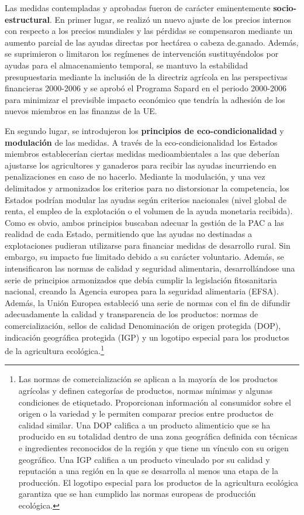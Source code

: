 \documentclass[10pt,a4paper]{article}
\begin{document}
Las medidas contempladas y aprobadas fueron de carácter eminentemente \textbf{socio-estructural}. En primer lugar, se realizó un nuevo ajuste de los precios internos con respecto a los precios mundiales y las pérdidas se compensaron mediante un aumento parcial de las ayudas directas por hectárea o cabeza de.ganado. Además, se suprimieron o limitaron los regímenes de intervención sustituyéndolos por ayudas para el almacenamiento temporal, se mantuvo la estabilidad presupuestaria mediante la inclusión de la directriz agrícola en las perspectivas financieras 2000-2006 y se aprobó el Programa Sapard en el periodo 2000-2006 para minimizar el previsible impacto económico que tendría la adhesión de los nuevos miembros en las finanzas de la UE.

En segundo lugar, se introdujeron los \textbf{principios de eco-condicionalidad} y \textbf{modulación} de las medidas. A través de la eco-condicionalidad los Estados miembros establecerían ciertas medidas medioambientales a las que deberían ajustarse los agricultores y ganaderos para recibir las ayudas incurriendo en penalizaciones en caso de no hacerlo. Mediante la modulación, y una vez delimitados y armonizados los criterios para no distorsionar la competencia, los Estados podrían modular las ayudas según criterios nacionales (nivel global de renta, el empleo de la explotación o el volumen de la ayuda monetaria recibida). Como es obvio, ambos principios buscaban adecuar la gestión de la PAC a las realidad de cada Estado, permitiendo que las ayudas no destinadas a explotaciones pudieran utilizarse para financiar medidas de desarrollo rural. Sin embargo, su impacto fue limitado debido a su carácter voluntario. Además, se intensificaron las normas de calidad y seguridad alimentaria, desarrollándose una serie de principios armonizados que debía cumplir la legislación fitosanitaria nacional, creando la Agencia europea para la seguridad alimentaria (EFSA). Además, la Unión Europea estableció una serie de normas con el fin de difundir adecuadamente la calidad y transparencia de los productos: normas de comercialización, sellos de calidad Denominación de origen protegida (DOP), indicación geográfica protegida (IGP) y un logotipo especial para los productos de la agricultura ecológica.\footnote{%
    Las normas de comercialización se aplican a la mayoría de los productos agrícolas y definen categorías de productos, normas mínimas y algunas condiciones de etiquetado. Proporcionan información al consumidor sobre el origen o la variedad y le permiten comparar precios entre productos de calidad similar. Una DOP califica a un producto alimenticio que se ha producido en su totalidad dentro de una zona geográfica definida con técnicas e ingredientes reconocidos de la región y que tiene un vínculo con su origen geográfico. Una IGP califica a un producto vinculado por su calidad y reputación a una región en la que se desarrolla al menos una etapa de la producción. El logotipo especial para los productos de la agricultura ecológica garantiza que se han cumplido las normas europeas de producción ecológica.
}
\end{document}
